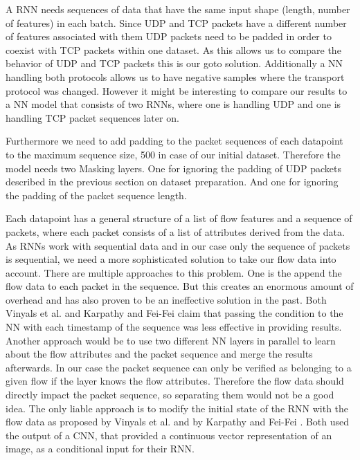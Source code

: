 \documentclass[
	ngerman,
	ruledheaders=section,%
	class=report,%
	thesis={type=bachelor},%
	accentcolor=9c,%
	custommargins=true,%
	marginpar=false,%
	parskip=half-,%
	fontsize=11pt,%
]{tudapub}
\begin{document}
A RNN needs sequences of data that have the same input shape (length, number of features) in each batch.
Since UDP and TCP packets have a different number of features associated with them UDP packets need to be padded in order to coexist with TCP packets within one dataset.
As this allows us to compare the behavior of UDP and TCP packets this is our goto solution.
Additionally a NN handling both protocols allows us to have negative samples where the transport protocol was changed.
However it might be interesting to compare our results to a NN model that consists of two RNNs, where one is handling UDP and one is handling TCP packet sequences later on.

Furthermore we need to add padding to the packet sequences of each datapoint to the maximum sequence size, 500 in case of our initial dataset.
Therefore the model needs two Masking layers.
One for ignoring the padding of UDP packets described in the previous section on dataset preparation.
And one for ignoring the padding of the packet sequence length.

Each datapoint has a general structure of a list of flow features and a sequence of packets, where each packet consists of a list of attributes derived from the data.
As RNNs work with sequential data and in our case only the sequence of packets is sequential, we need a more sophisticated solution to take our flow data into account.
There are multiple approaches to this problem.
One is the append the flow data to each packet in the sequence.
But this creates an enormous amount of overhead and has also proven to be an ineffective solution in the past.
Both Vinyals et al. \cite{vinyalsShowTellNeural2015} and Karpathy and Fei-Fei \cite{karpathyDeepVisualSemanticAlignments2015} claim that passing the condition to the NN with each timestamp of the sequence was less effective in providing results.
Another approach would be to use two different NN layers in parallel to learn about the flow attributes and the packet sequence and merge the results afterwards.
In our case the  packet sequence can only be verified as belonging to a given flow if the layer knows the flow attributes.
Therefore the flow data should directly impact the packet sequence, so separating them would not be a good idea.
The only liable approach is to modify the initial state of the RNN with the flow data as proposed by Vinyals et al. \cite{vinyalsShowTellNeural2015} and by Karpathy and Fei-Fei \cite{karpathyDeepVisualSemanticAlignments2015}.
Both used the output of a CNN, that provided a continuous vector representation of an image, as a conditional input for their RNN.
\end{document}
